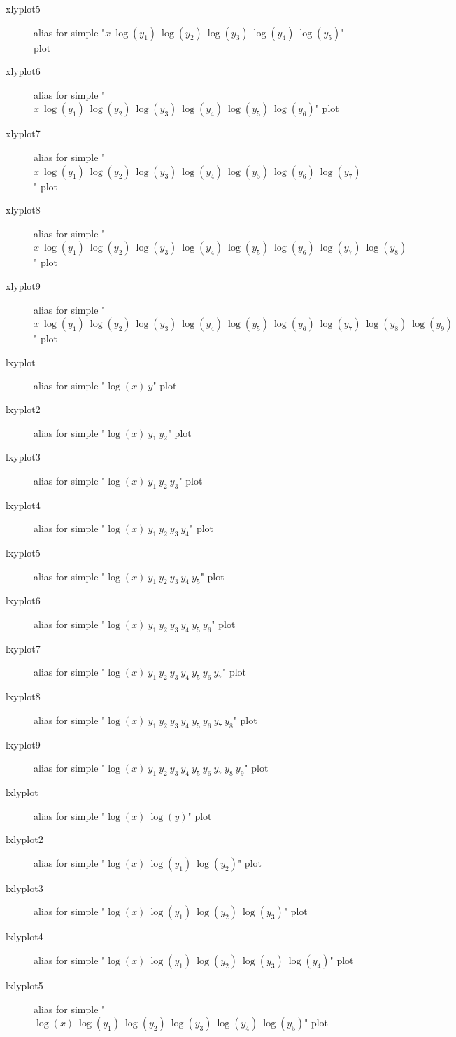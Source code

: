 \documentclass[a4paper,10pt]{report}
\begin{document}
\begin{itemize}
\begin{description}
  \item[xlyplot5] alias for simple "$x~\log(y_1)~\log(y_2)~\log(y_3)~\log(y_4)~\log(y_5)$" plot
  \item[xlyplot6] alias for simple "$x~\log(y_1)~\log(y_2)~\log(y_3)~\log(y_4)~\log(y_5)~\log(y_6)$" plot
  \item[xlyplot7] alias for simple "$x~\log(y_1)~\log(y_2)~\log(y_3)~\log(y_4)~\log(y_5)~\log(y_6)~\log(y_7)$" plot
  \item[xlyplot8] alias for simple "$x~\log(y_1)~\log(y_2)~\log(y_3)~\log(y_4)~\log(y_5)~\log(y_6)~\log(y_7)~\log(y_8)$" plot
  \item[xlyplot9] alias for simple "$x~\log(y_1)~\log(y_2)~\log(y_3)~\log(y_4)~\log(y_5)~\log(y_6)~\log(y_7)~\log(y_8)~\log(y_9)$" plot
  \item[lxyplot ] alias for simple "$\log(x)~y$" plot
  \item[lxyplot2] alias for simple "$\log(x)~y_1~y_2$" plot
  \item[lxyplot3] alias for simple "$\log(x)~y_1~y_2~y_3$" plot
  \item[lxyplot4] alias for simple "$\log(x)~y_1~y_2~y_3~y_4$" plot
  \item[lxyplot5] alias for simple "$\log(x)~y_1~y_2~y_3~y_4~y_5$" plot
  \item[lxyplot6] alias for simple "$\log(x)~y_1~y_2~y_3~y_4~y_5~y_6$" plot
  \item[lxyplot7] alias for simple "$\log(x)~y_1~y_2~y_3~y_4~y_5~y_6~y_7$" plot
  \item[lxyplot8] alias for simple "$\log(x)~y_1~y_2~y_3~y_4~y_5~y_6~y_7~y_8$" plot
  \item[lxyplot9] alias for simple "$\log(x)~y_1~y_2~y_3~y_4~y_5~y_6~y_7~y_8~y_9$" plot
  \item[lxlyplot ] alias for simple "$\log(x)~\log(y)$" plot
  \item[lxlyplot2] alias for simple "$\log(x)~\log(y_1)~\log(y_2)$" plot
  \item[lxlyplot3] alias for simple "$\log(x)~\log(y_1)~\log(y_2)~\log(y_3)$" plot
  \item[lxlyplot4] alias for simple "$\log(x)~\log(y_1)~\log(y_2)~\log(y_3)~\log(y_4)$" plot
  \item[lxlyplot5] alias for simple "$\log(x)~\log(y_1)~\log(y_2)~\log(y_3)~\log(y_4)~\log(y_5)$" plot

\end{description}
\end{itemize}
\end{document}
